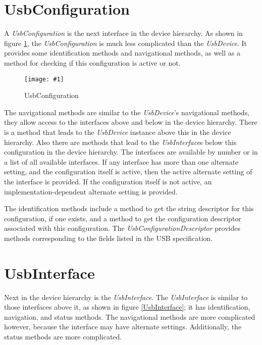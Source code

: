 \documentclass{article}
\newcommand{\myinterface}[1]{\emph{#1}}
\newcommand{\mysectionend}[0]{\vfill\pagebreak[1]}
\newcommand{\myfigure}[3]{\begin{figure}[htbp]\centering\texttt{[image: \#1]}\caption{#2}\label{#3}\end{figure}}
\begin{document}
\section{UsbConfiguration}

A \myinterface{UsbConfiguration} is the next interface in the device hierarchy.
As shown in figure \ref{UsbConfiguration}, the \myinterface{UsbConfiguration}
is much less complicated than the \myinterface{UsbDevice}.  It provides some
identification methods and navigational methods, as well as a
method for checking if this configuration is active or not.

\myfigure{figs/UsbConfiguration}{UsbConfiguration}{UsbConfiguration}

The navigational methods are similar to the \myinterface{UsbDevice}'s navigational
methods, they allow access to the interfaces above and below in the
device hierarchy.  There is a method that leads to the \myinterface{UsbDevice}
instance above this in the device hierarchy.  Also there are methods
that lead to the \myinterface{UsbInterface}s below this configuration in the device
hierarchy.  The interfaces are available by number or in a list of all
available interfaces.  If any interface has more than one alternate
setting, and the configuration itself is active, then the active
alternate setting of the interface is provided.  If the configuration
itself is not active, an implementation-dependent alternate setting
is provided.

The identification methods include a method to get the string
descriptor for this configuration, if one exists, and a method to get
the configuration descriptor associated with this configuration.  The
\myinterface{UsbConfigurationDescriptor} provides methods corresponding to the fields
listed in the USB specification.

\mysectionend

%

\section{UsbInterface}

Next in the device hierarchy is the \myinterface{UsbInterface}.  The \myinterface{UsbInterface} is
similar to those interfaces above it, as shown in figure \ref{UsbInterface};
it has identification, navigation, and status methods.  The navigational
methods are more complicated however, because the interface may have
alternate settings.  Additionally, the status methods are more complicated.
\end{document}

